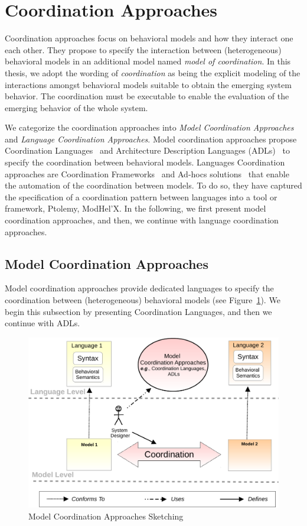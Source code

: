 \section{Coordination Approaches}
Coordination approaches focus on behavioral models and how they interact one each other. They propose to specify the interaction between (heterogeneous) behavioral models in an additional model named \emph{model of coordination}. In this thesis, we adopt the wording of \emph{coordination} as being the explicit modeling of the interactions amongst behavioral models suitable to obtain the emerging system behavior. The coordination must be executable to enable the evaluation of the emerging behavior of the whole system. 

We categorize the coordination approaches into \emph{Model Coordination Approaches} and \emph{Language Coordination Approaches}. Model coordination approaches propose Coordination Languages~\cite{coordsignibib} and Architecture Description Languages (ADLs)~\cite{frameadlsbib} to specify the coordination between behavioral models. Languages Coordination approaches are Coordination Frameworks~\cite{ptoleframebib,modhelxbib} and Ad-hocs solutions~\cite{mascotbib,dinatale} that enable the automation of the coordination between models. To do so, they have captured the specification of a coordination pattern between languages into a tool or framework, \eg Ptolemy, ModHel'X. In the following, we first present model coordination approaches, and then, we continue with language coordination approaches.
\subsection{Model Coordination Approaches}
Model coordination approaches provide dedicated languages to specify the coordination between (heterogeneous) behavioral models (see Figure~\ref{fig:modelcoord}). We begin this subsection by presenting Coordination Languages, and then we continue with ADLs. 

\begin{figure}
	\begin{center}
		\includegraphics[width=.7\textwidth]{background/figs/coordmodel}
		\caption{Model Coordination Approaches Sketching}
		\label{fig:modelcoord}
	\end{center}
\end{figure}

